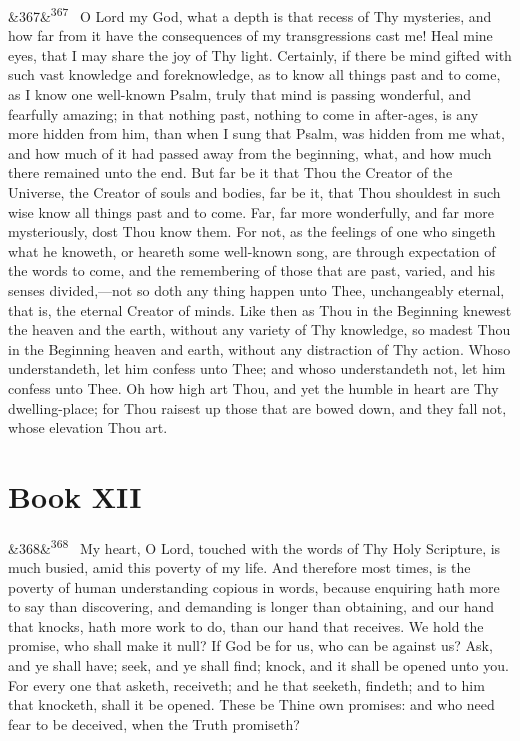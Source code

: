 \documentclass[12pt]{article}
\newcommand{\para}[1][]{\par\noindent\ifx&#1&\else\textsuperscript{\footnotesize #1}~\fi}
\begin{document}
\para[367] O Lord my God, what a depth is that recess of Thy mysteries, and how far from it have the consequences of my transgressions cast me! Heal mine eyes, that I may share the joy of Thy light. Certainly, if there be mind gifted with such vast knowledge and foreknowledge, as to know all things past and to come, as I know one well-known Psalm, truly that mind is passing wonderful, and fearfully amazing; in that nothing past, nothing to come in after-ages, is any more hidden from him, than when I sung that Psalm, was hidden from me what, and how much of it had passed away from the beginning, what, and how much there remained unto the end. But far be it that Thou the Creator of the Universe, the Creator of souls and bodies, far be it, that Thou shouldest in such wise know all things past and to come. Far, far more wonderfully, and far more mysteriously, dost Thou know them. For not, as the feelings of one who singeth what he knoweth, or heareth some well-known song, are through expectation of the words to come, and the remembering of those that are past, varied, and his senses divided,---not so doth any thing happen unto Thee, unchangeably eternal, that is, the eternal Creator of minds. Like then as Thou in the Beginning knewest the heaven and the earth, without any variety of Thy knowledge, so madest Thou in the Beginning heaven and earth, without any distraction of Thy action. Whoso understandeth, let him confess unto Thee; and whoso understandeth not, let him confess unto Thee. Oh how high art Thou, and yet the humble in heart are Thy dwelling-place; for Thou raisest up those that are bowed down, and they fall not, whose elevation Thou art.

\section*{Book XII}

\para[368] My heart, O Lord, touched with the words of Thy Holy Scripture, is much busied, amid this poverty of my life. And therefore most times, is the poverty of human understanding copious in words, because enquiring hath more to say than discovering, and demanding is longer than obtaining, and our hand that knocks, hath more work to do, than our hand that receives. We hold the promise, who shall make it null? If God be for us, who can be against us? Ask, and ye shall have; seek, and ye shall find; knock, and it shall be opened unto you. For every one that asketh, receiveth; and he that seeketh, findeth; and to him that knocketh, shall it be opened. These be Thine own promises: and who need fear to be deceived, when the Truth promiseth?
\end{document}
